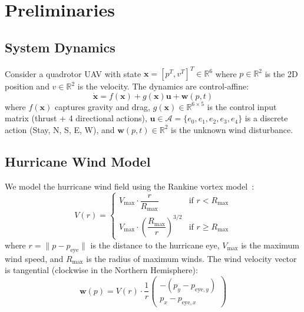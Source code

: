 \documentclass[11pt,twocolumn]{article}
\theoremstyle{definition}
\newcommand{\R}{\mathbb{R}}
\newcommand{\cA}{\mathcal{A}}
\newcommand{\vect}[1]{\mathbf{#1}}
\begin{document}
\section{Preliminaries}
\label{sec:preliminaries}

\subsection{System Dynamics}
\label{sec:dynamics}

Consider a quadrotor UAV with state $\vect{x} = [p^T, v^T]^T \in \R^6$ where $p \in \R^2$ is the 2D position and $v \in \R^2$ is the velocity. The dynamics are control-affine:
\begin{equation}
\label{eq:dynamics}
\dot{\vect{x}} = f(\vect{x}) + g(\vect{x})\vect{u} + \vect{w}(p,t)
\end{equation}
where $f(\vect{x})$ captures gravity and drag, $g(\vect{x}) \in \R^{6 \times 5}$ is the control input matrix (thrust + 4 directional actions), $\vect{u} \in \cA = \{e_0, e_1, e_2, e_3, e_4\}$ is a discrete action (Stay, N, S, E, W), and $\vect{w}(p,t) \in \R^2$ is the unknown wind disturbance.

\subsection{Hurricane Wind Model}
\label{sec:hurricane_model}

We model the hurricane wind field using the Rankine vortex model~\citep{Holland2010}:
\begin{equation}
\label{eq:rankine}
V(r) = \begin{cases}
V_{\max} \cdot \dfrac{r}{R_{\max}} & \text{if } r < R_{\max} \\[0.5em]
V_{\max} \cdot \left(\dfrac{R_{\max}}{r}\right)^{3/2} & \text{if } r \geq R_{\max}
\end{cases}
\end{equation}
where $r = \|p - p_{\text{eye}}\|$ is the distance to the hurricane eye, $V_{\max}$ is the maximum wind speed, and $R_{\max}$ is the radius of maximum winds. The wind velocity vector is tangential (clockwise in the Northern Hemisphere):
\begin{equation}
\vect{w}(p) = V(r) \cdot \frac{1}{r}\begin{pmatrix} -(p_y - p_{\text{eye},y}) \\ p_x - p_{\text{eye},x} \end{pmatrix}
\end{equation}
\end{document}
